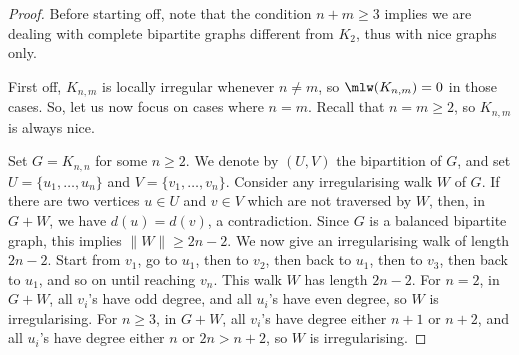 \documentclass[a4paper,11pt,dvipsnames]{elsarticle}
\begin{document}
\begin{proof}
Before starting off, note that the condition $n+m \geq 3$ implies we are dealing with complete bipartite graphs different from $K_2$, thus with nice graphs only.

First off, $K_{n,m}$ is locally irregular whenever $n \neq m$, so $\mlw(K_{n,m})=0$ in those cases.
So, let us now focus on cases where $n=m$.
Recall that $n=m \geq 2$, so $K_{n,m}$ is always nice.

Set $G=K_{n,n}$ for some $n \geq 2$.
We denote by $(U,V)$ the bipartition of $G$, and set $U=\{u_1,\dots,u_n\}$ and $V=\{v_1,\dots,v_n\}$.
Consider any irregularising walk $W$ of $G$.
If there are two vertices $u \in U$ and $v \in V$ which are not traversed by $W$, then, in $G+W$, we have $d(u)=d(v)$, a contradiction.
Since $G$ is a balanced bipartite graph, this implies $\|W\| \geq 2n-2$.
We now give an irregularising walk of length $2n-2$. Start from $v_1$, go to $u_1$, then to $v_2$, then back to $u_1$, then to $v_3$, then back to $u_1$, and so on until reaching $v_n$. This walk $W$ has length $2n-2$. For $n=2$, in $G+W$, all $v_i$'s have odd degree, and all $u_i$'s have even degree, so $W$ is irregularising.
For $n \geq 3$, in $G+W$, all $v_i$'s have degree either $n+1$ or $n+2$, and all $u_i$'s have degree either $n$ or $2n > n+2$, so $W$ is irregularising.

\end{proof}
\end{document}

